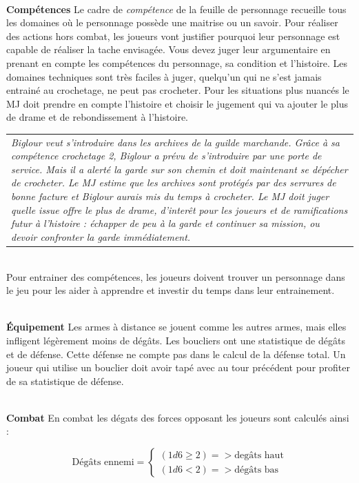 \documentclass[11pt]{article} %
\newcommand{\myjump}[1][1]{\mbox{}\\[#1cm]}
\begin{document}
\myjump[0]
\textbf{Compétences}\newline
Le cadre de \emph{compétence} de la feuille de personnage recueille tous les domaines où le personnage possède une maitrise ou un savoir. Pour réaliser des actions hors combat, les joueurs vont justifier pourquoi leur personnage est capable de réaliser la tache envisagée. Vous devez juger leur argumentaire en prenant en compte les compétences du personnage, sa condition et l'histoire. Les domaines techniques sont très faciles à juger, quelqu'un qui ne s'est jamais entrainé au crochetage, ne peut pas crocheter. Pour les situations plus nuancés le MJ doit prendre en compte l'histoire et choisir le jugement qui va ajouter le plus de drame et de rebondissement à l'histoire.\newline\newline
\begin{tabularx}{\linewidth}{|X}
\emph{Biglour veut s'introduire dans les archives de la guilde marchande. Grâce à sa compétence crochetage 2, Biglour a prévu de s'introduire par une porte de service. Mais il a alerté la garde sur son chemin et doit maintenant se dépécher de crocheter. Le MJ estime que les archives sont protégés par des serrures de bonne facture et Biglour aurais mis du temps à crocheter. Le MJ doit juger quelle issue offre le plus de drame, d'interêt pour les joueurs et de ramifications futur à l'histoire : échapper de peu à la garde et continuer sa mission, ou devoir confronter la garde immédiatement. }\\
\end{tabularx}
\myjump[0.35]
Pour entrainer des compétences, les joueurs doivent trouver un personnage dans le jeu pour les aider à apprendre et investir du temps dans leur entrainement.


\myjump[0]
\textbf{Équipement}\newline
Les armes à distance se jouent comme les autres armes, mais elles infligent légèrement moins de dégâts. Les boucliers ont une statistique de dégâts et de défense. Cette défense ne compte pas dans le calcul de la défense total. Un joueur qui utilise un bouclier doit avoir tapé avec au tour précédent pour profiter de sa statistique de défense.


\myjump[0]
\textbf{Combat}\newline
En combat les dégats des forces opposant les joueurs sont calculés ainsi :

$$
\mbox{Dégâts ennemi} =
\left\{
    \begin{array}{ll}
        (1d6 \ge 2) => \mbox{degâts haut}\\
        (1d6 < 2) => \mbox{dégâts bas}
    \end{array}
\right.
$$
\end{document}

